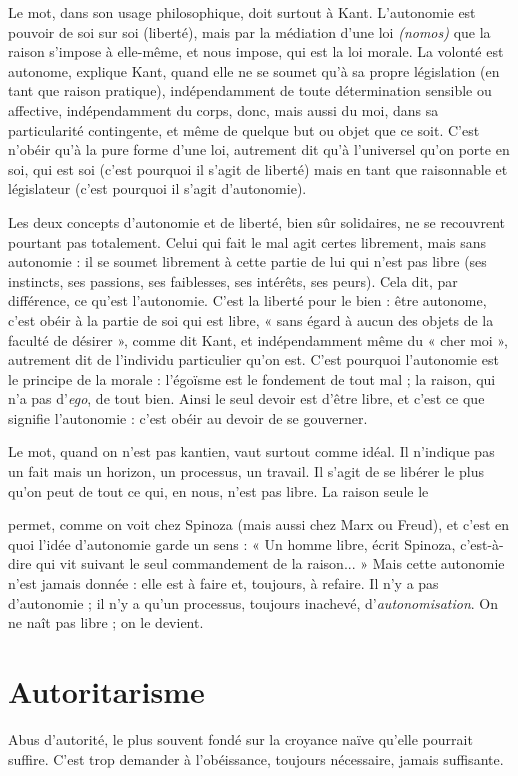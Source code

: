 Le mot, dans son usage philosophique, doit surtout à Kant. L’autonomie
est pouvoir de soi sur soi (liberté), mais par la médiation d’une loi {\it (nomos)}
que la raison s'impose à elle-même, et nous impose, qui est la loi morale. La
volonté est autonome, explique Kant, quand elle ne se soumet qu'à sa
propre législation (en tant que raison pratique), indépendamment de toute
détermination sensible ou affective, indépendamment du corps, donc, mais
aussi du moi, dans sa particularité contingente, et même de quelque but ou
objet que ce soit. C’est n’obéir qu’à la pure forme d’une loi, autrement dit
qu’à l’universel qu’on porte en soi, qui est soi (c’est pourquoi il s’agit de
liberté) mais en tant que raisonnable et législateur (c’est pourquoi il s’agit
d'autonomie).

Les deux concepts d’autonomie et de liberté, bien sûr solidaires, ne se
recouvrent pourtant pas totalement. Celui qui fait le mal agit certes librement,
mais sans autonomie : il se soumet librement à cette partie de lui qui n’est pas
libre (ses instincts, ses passions, ses faiblesses, ses intérêts, ses peurs). Cela dit,
par différence, ce qu’est l'autonomie. C’est la liberté pour le bien : être autonome,
c’est obéir à la partie de soi qui est libre, « sans égard à aucun des objets
de la faculté de désirer », comme dit Kant, et indépendamment même du
« cher moi », autrement dit de l’individu particulier qu’on est. C’est pourquoi
l’autonomie est le principe de la morale : l’égoïsme est le fondement de tout
mal ; la raison, qui n’a pas d’{\it ego}, de tout bien. Ainsi le seul devoir est d’être
libre, et c’est ce que signifie l’autonomie : c’est obéir au devoir de se gouverner.

Le mot, quand on n’est pas kantien, vaut surtout comme idéal. Il n’indique
pas un fait mais un horizon, un processus, un travail. Il s’agit de se libérer le
plus qu’on peut de tout ce qui, en nous, n’est pas libre. La raison seule le

permet, comme on voit chez Spinoza (mais aussi chez Marx ou Freud), et c’est
en quoi l’idée d'autonomie garde un sens : « Un homme libre, écrit Spinoza,
c’est-à-dire qui vit suivant le seul commandement de la raison... » Mais cette
autonomie n’est jamais donnée : elle est à faire et, toujours, à refaire. Il n’y a
pas d’autonomie ; il n’y a qu’un processus, toujours inachevé, d’{\it autonomisation}.
On ne naît pas libre ; on le devient.

\section{Autoritarisme}
Abus d'autorité, le plus souvent fondé sur la croyance
naïve qu’elle pourrait suffire. C’est trop demander à
l’obéissance, toujours nécessaire, jamais suffisante.

